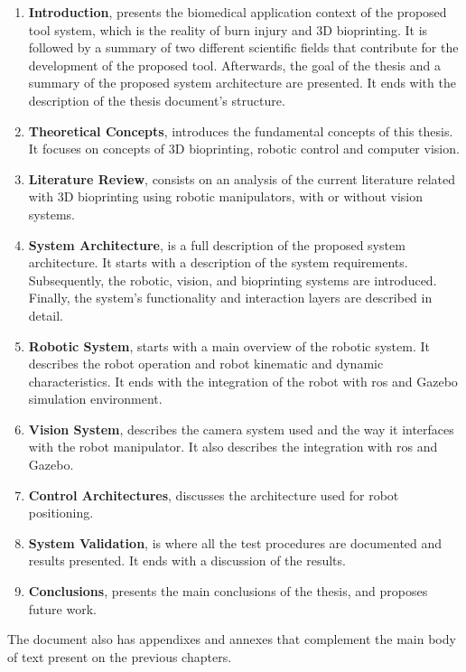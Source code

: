 \begin{enumerate}
    \item \textbf{Introduction}, presents the biomedical application context of the proposed tool system, which is the reality of burn injury and 3D bioprinting. It is followed by a summary of two different scientific fields that contribute for the development of the proposed tool. Afterwards, the goal of the thesis and a summary of the proposed system architecture are presented. It ends with the description of the thesis document's structure.
    
    \item \textbf{Theoretical Concepts}, introduces the fundamental concepts of this thesis. It focuses on concepts of 3D bioprinting, robotic control and computer vision. 
    
    \item \textbf{Literature Review}, consists on an analysis of the current literature related with 3D bioprinting using robotic manipulators, with or without vision systems.
    
    \item \textbf{System Architecture}, is a full description of the proposed system architecture. It starts with a description of the system requirements. Subsequently, the robotic, vision, and bioprinting systems are introduced. Finally, the system's functionality and interaction layers are described in detail.
    
    \item \textbf{Robotic System}, starts with a main overview of the robotic system. It describes the robot operation and robot kinematic and dynamic characteristics. It ends with the integration of the robot with \gls{ros} and Gazebo simulation environment.
    
    \item \textbf{Vision System}, describes the camera system used and the way it interfaces with the robot manipulator. It also describes the integration with \gls{ros} and Gazebo.
    
    \item \textbf{Control Architectures}, discusses the architecture used for robot positioning.
    
    \item \textbf{System Validation}, is where all the test procedures are documented and results presented. It ends with a discussion of the results.
    
    \item \textbf{Conclusions}, presents the main conclusions of the thesis, and proposes future work.
\end{enumerate}

The document also has appendixes and annexes that complement the main body of text present on the previous chapters.

